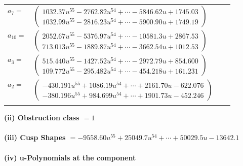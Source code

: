 \documentclass[1p]{elsarticle_modified}
\theoremstyle{definition}
\begin{document}
\begin{tabular}{m{7pt} m{180pt} m{7pt} m{180pt} }
\flushright $a_{7}=$&$\begin{pmatrix}1032.37 u^{55}-2762.82 u^{54}+\cdots-5846.62 u+1745.03\\1032.99 u^{55}-2816.23 u^{54}+\cdots-5900.90 u+1749.19\end{pmatrix}$ \\
\flushright $a_{10}=$&$\begin{pmatrix}2052.67 u^{55}-5376.97 u^{54}+\cdots-10581.3 u+2867.53\\713.013 u^{55}-1889.87 u^{54}+\cdots-3662.54 u+1012.53\end{pmatrix}$ \\
\flushright $a_{3}=$&$\begin{pmatrix}515.440 u^{55}-1427.52 u^{54}+\cdots-2972.79 u+854.600\\109.772 u^{55}-295.482 u^{54}+\cdots-454.218 u+161.231\end{pmatrix}$ \\
\flushright $a_{2}=$&$\begin{pmatrix}-430.191 u^{55}+1086.19 u^{54}+\cdots+2161.70 u-622.076\\-380.196 u^{55}+984.699 u^{54}+\cdots+1901.73 u-452.246\end{pmatrix}$\\&\end{tabular}
\flushleft \textbf{(ii) Obstruction class $= 1$}\\~\\
\flushleft \textbf{(iii) Cusp Shapes $= -9558.60 u^{55}+25049.7 u^{54}+\cdots+50029.5 u-13642.1$}\\~\\
\newpage\renewcommand{\arraystretch}{1}
\flushleft \textbf{(iv) u-Polynomials at the component}\newline \\
\end{document}
